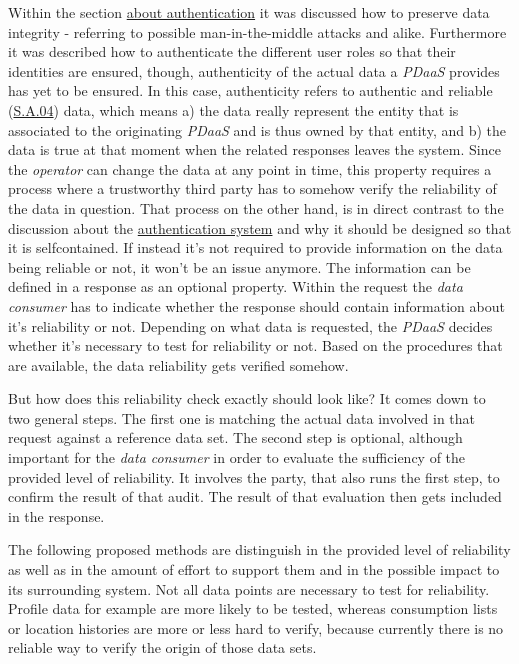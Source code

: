 \documentclass[12pt,english,a4paper,titlepage,cleardoublepage=empty,dottedtoc]{report}
\begin{document}
Within the section \protect\hyperlink{authentication}{about
authentication} it was discussed how to preserve data integrity -
referring to possible man-in-the-middle attacks and alike. Furthermore
it was described how to authenticate the different user roles so that
their identities are ensured, though, authenticity of the actual data a
\emph{PDaaS} provides has yet to be ensured. In this case, authenticity
refers to authentic and reliable (\protect\hyperlink{sa04}{S.A.04})
data, which means a) the data really represent the entity that is
associated to the originating \emph{PDaaS} and is thus owned by that
entity, and b) the data is true at that moment when the related
responses leaves the system. Since the \emph{operator} can change the
data at any point in time, this property requires a process where a
trustworthy third party has to somehow verify the reliability of the
data in question. That process on the other hand, is in direct contrast
to the discussion about the
\protect\hyperlink{authentication}{authentication system} and why it
should be designed so that it is selfcontained. If instead it's not
required to provide information on the data being reliable or not, it
won't be an issue anymore. The information can be defined in a response
as an optional property. Within the request the \emph{data consumer} has
to indicate whether the response should contain information about it's
reliability or not. Depending on what data is requested, the
\emph{PDaaS} decides whether it's necessary to test for reliability or
not. Based on the procedures that are available, the data reliability
gets verified somehow.

But how does this reliability check exactly should look like? It comes
down to two general steps. The first one is matching the actual data
involved in that request against a reference data set. The second step
is optional, although important for the \emph{data consumer} in order to
evaluate the sufficiency of the provided level of reliability. It
involves the party, that also runs the first step, to confirm the result
of that audit. The result of that evaluation then gets included in the
response.

The following proposed methods are distinguish in the provided level of
reliability as well as in the amount of effort to support them and in
the possible impact to its surrounding system. Not all data points are
necessary to test for reliability. Profile data for example are more
likely to be tested, whereas consumption lists or location histories are
more or less hard to verify, because currently there is no reliable way
to verify the origin of those data sets.
\end{document}
